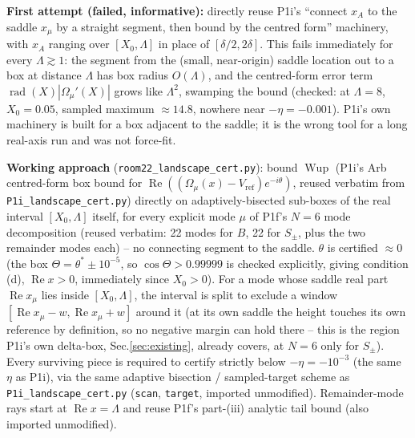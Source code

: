 \documentclass[11pt]{article}
\begin{document}
\textbf{First attempt (failed, informative):} directly reuse P1i's ``connect $x_A$ to the saddle $x_\mu$ by
a straight segment, then bound by the centred form'' machinery, with $x_A$ ranging over $[X_0,\Lambda]$
in place of $[\delta/2,2\delta]$. This fails immediately for every $\Lambda\gtrsim1$: the segment from the
(small, near-origin) saddle location out to a box at distance $\Lambda$ has box radius $O(\Lambda)$, and
the centred-form error term $\operatorname{rad}(X)|\Omega_\mu'(X)|$ grows like $\Lambda^2$, swamping the
bound (checked: at $\Lambda=8$, $X_0=0.05$, sampled maximum $\approx14.8$, nowhere near
$-\eta=-0.001$). P1i's own machinery is built for a box adjacent to the saddle; it is the wrong tool for
a long real-axis run and was not force-fit.

\textbf{Working approach} (\texttt{room22\_landscape\_cert.py}): bound $\operatorname{Wup}$ (P1i's Arb
centred-form box bound for $\operatorname{Re}((\Omega_\mu(x)-V_{\mathrm{ref}})e^{-i\theta})$, reused
verbatim from \texttt{P1i\_landscape\_cert.py}) directly on adaptively-bisected sub-boxes of the real
interval $[X_0,\Lambda]$ itself, for every explicit mode $\mu$ of P1f's $N=6$ mode decomposition (reused
verbatim: 22 modes for $B$, 22 for $S_\pm$, plus the two remainder modes each) -- no connecting segment
to the saddle. $\theta$ is certified $\approx0$ (the box $\Theta=\theta^*\pm10^{-5}$, so
$\cos\Theta>0.99999$ is checked explicitly, giving condition (d), $\operatorname{Re}x>0$, immediately
since $X_0>0$). For a mode whose saddle real part $\operatorname{Re}x_\mu$ lies inside $[X_0,\Lambda]$,
the interval is split to exclude a window $[\operatorname{Re}x_\mu-w,\operatorname{Re}x_\mu+w]$ around it
(at its own saddle the height touches its own reference by definition, so no negative margin can hold
there -- this is the region P1i's own delta-box, Sec.\ref{sec:existing}, already covers, at $N=6$ only
for $S_\pm$). Every surviving piece is required to certify strictly below $-\eta=-10^{-3}$ (the same
$\eta$ as P1i), via the same adaptive bisection / sampled-target scheme as \texttt{P1i\_landscape\_cert.py}
(\texttt{scan}, \texttt{target}, imported unmodified). Remainder-mode rays start at $\operatorname{Re}x=\Lambda$
and reuse P1f's part-(iii) analytic tail bound (also imported unmodified).
\end{document}

